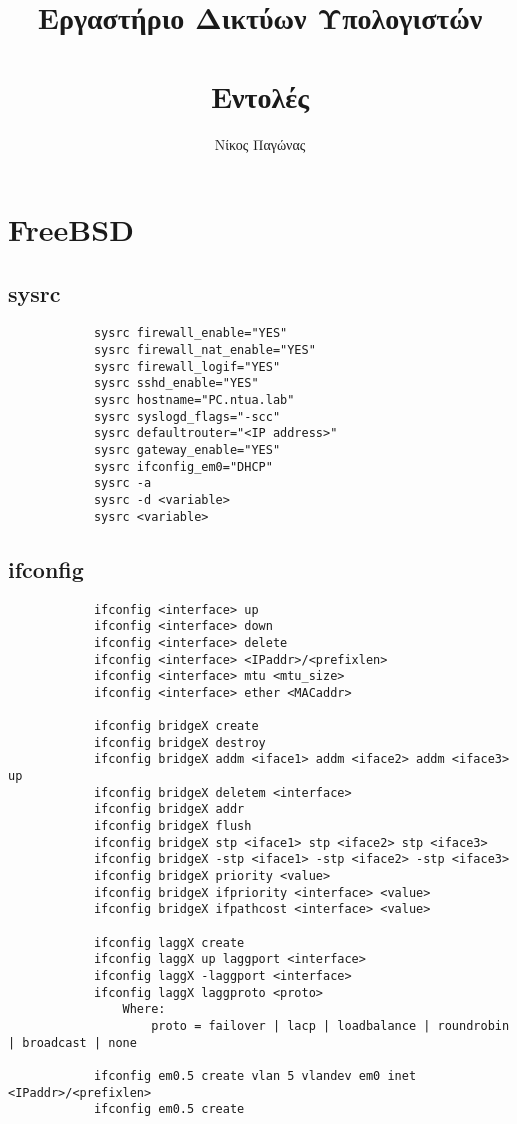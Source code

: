 \documentclass[a4paper, 12pt]{article}
\title{
	\textbf{Εργαστήριο Δικτύων Υπολογιστών} \\~\\
	Εντολές
}
\author{Νίκος Παγώνας}
\date{}
\begin{document}
\maketitle

\section{FreeBSD}
	\subsection{sysrc}
		\begin{verbatim}
			sysrc firewall_enable="YES"		
			sysrc firewall_nat_enable="YES"
			sysrc firewall_logif="YES"	
			sysrc sshd_enable="YES"
			sysrc hostname="PC.ntua.lab"
			sysrc syslogd_flags="-scc"
			sysrc defaultrouter="<IP address>"
			sysrc gateway_enable="YES"
			sysrc ifconfig_em0="DHCP"
			sysrc -a 
			sysrc -d <variable>
			sysrc <variable>
		\end{verbatim}
	
	\subsection{ifconfig}
		\begin{verbatim}
			ifconfig <interface> up
			ifconfig <interface> down
			ifconfig <interface> delete
			ifconfig <interface> <IPaddr>/<prefixlen>
			ifconfig <interface> mtu <mtu_size>
			ifconfig <interface> ether <MACaddr>		    
 
			ifconfig bridgeX create
			ifconfig bridgeX destroy
			ifconfig bridgeX addm <iface1> addm <iface2> addm <iface3> up
			ifconfig bridgeX deletem <interface>
			ifconfig bridgeX addr
			ifconfig bridgeX flush
			ifconfig bridgeX stp <iface1> stp <iface2> stp <iface3>
			ifconfig bridgeX -stp <iface1> -stp <iface2> -stp <iface3>
			ifconfig bridgeX priority <value>
			ifconfig bridgeX ifpriority <interface> <value>
			ifconfig bridgeX ifpathcost <interface> <value>

			ifconfig laggX create
			ifconfig laggX up laggport <interface>
			ifconfig laggX -laggport <interface>
			ifconfig laggX laggproto <proto>
			    Where:
			        proto = failover | lacp | loadbalance | roundrobin | broadcast | none
				
			ifconfig em0.5 create vlan 5 vlandev em0 inet <IPaddr>/<prefixlen>
			ifconfig em0.5 create

		\end{verbatim}
		
\end{document}
